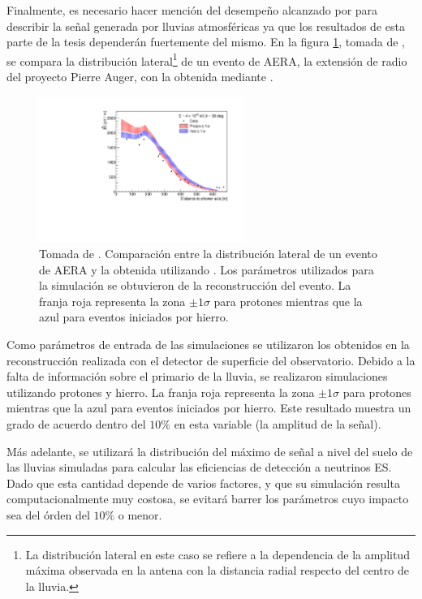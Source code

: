 		Finalmente, es necesario hacer menci\'on del desempe\~no alcanzado por \zhs{} para describir la se\~nal generada por lluvias atmosf\'ericas ya que los resultados de esta parte de la tesis depender\'an fuertemente del mismo.
		En la figura \ref{fig:zhsvsdata}, tomada de \cite{cite:icrc13Auger}, se compara la distribuci\'on lateral\footnote{La distribuci\'on lateral en este caso se refiere a la dependencia de la amplitud m\'axima observada en la antena con la distancia radial respecto del centro de la lluvia.} de un evento de AERA, la extensi\'on de radio del proyecto Pierre Auger, con la obtenida mediante \zhs{}.
		\begin{figure}[ht!]
		\centering
			\includegraphics[width=0.6\textwidth]{fig/simulacionRadio/ZHAireS_and_data}
			\caption{\label{fig:zhsvsdata} Tomada de \cite{cite:icrc13Auger}. Comparaci\'on entre la distribuci\'on lateral de un evento de AERA y la obtenida utilizando \zhs{}. Los par\'ametros utilizados para la simulaci\'on se obtuvieron de la reconstrucci\'on del evento. La franja roja representa la zona $\pm1\sigma$ para protones mientras que la azul para eventos iniciados por hierro.}
		\end{figure}
		Como par\'ametros de entrada de las simulaciones se utilizaron los obtenidos en la reconstrucci\'on realizada con el detector de superficie del observatorio. 
		Debido a la falta de informaci\'on sobre el primario de la lluvia, se realizaron simulaciones utilizando protones y hierro. La franja roja representa la zona $\pm1\sigma$ para protones mientras que la azul para eventos iniciados por hierro.
		Este resultado muestra un grado de acuerdo dentro del $10\%$ en esta variable (la amplitud de la se\~nal).
		
		M\'as adelante, se utilizar\'a la distribuci\'on del m\'aximo de se\~nal a nivel del suelo de las lluvias simuladas para calcular las eficiencias de detecci\'on a neutrinos ES. 
		Dado que esta cantidad depende de varios factores, y que su simulaci\'on resulta computacionalmente muy costosa, se evitar\'a barrer los par\'ametros cuyo impacto sea del \'orden del $10\%$ o menor.
		
